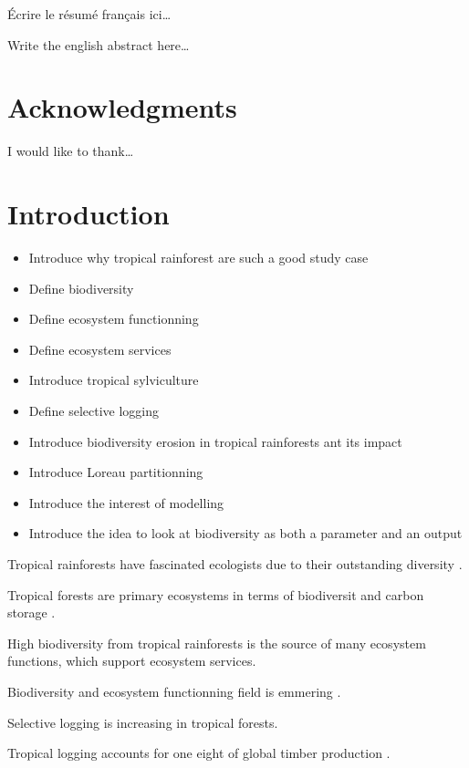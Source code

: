 \documentclass[]{article}
\providecommand{\tightlist}{%
  \setlength{\itemsep}{0pt}\setlength{\parskip}{0pt}}
\begin{document}
Écrire le résumé français ici\ldots{}

Write the english abstract here\ldots{}

\section*{Acknowledgments}\label{acknowledgments}

I would like to thank\ldots{}

\section*{Introduction}\label{introduction}

\begin{itemize}
\tightlist
\item
  Introduce why tropical rainforest are such a good study case
\item
  Define biodiversity
\item
  Define ecosystem functionning
\item
  Define ecosystem services
\item
  Introduce tropical sylviculture
\item
  Define selective logging
\item
  Introduce biodiversity erosion in tropical rainforests ant its impact
\item
  Introduce Loreau partitionning
\item
  Introduce the interest of modelling
\item
  Introduce the idea to look at biodiversity as both a parameter and an
  output
\end{itemize}

Tropical rainforests have fascinated ecologists due to their outstanding
diversity \citep{connell_diversity_1978}.

Tropical forests are primary ecosystems in terms of biodiversit and
carbon storage \citep{Lewis2004}.

High biodiversity from tropical rainforests is the source of many
ecosystem functions, which support ecosystem services.

Biodiversity and ecosystem functionning field is emmering
\citep{Loreau2000}.

Selective logging is increasing in tropical forests.

Tropical logging accounts for one eight of global timber production
\citep{Blaser2011}.
\end{document}
